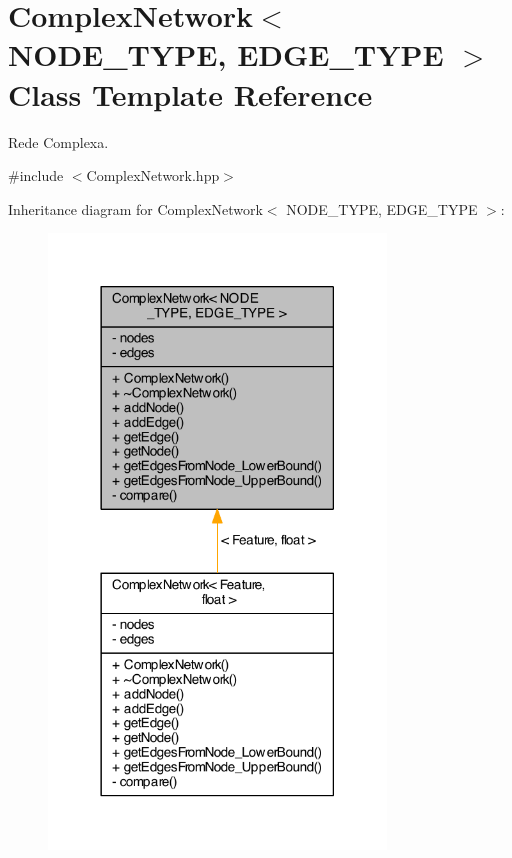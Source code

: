 \hypertarget{class_complex_network}{\section{Complex\+Network$<$ N\+O\+D\+E\+\_\+\+T\+Y\+P\+E, E\+D\+G\+E\+\_\+\+T\+Y\+P\+E $>$ Class Template Reference}
\label{class_complex_network}
}


Rede Complexa.  




{\ttfamily \#include $<$Complex\+Network.\+hpp$>$}



Inheritance diagram for Complex\+Network$<$ N\+O\+D\+E\+\_\+\+T\+Y\+P\+E, E\+D\+G\+E\+\_\+\+T\+Y\+P\+E $>$\+:
\nopagebreak
\begin{figure}[H]
\begin{center}
\leavevmode
\includegraphics[width=254pt]{class_complex_network__inherit__graph}
\end{center}
\end{figure}


